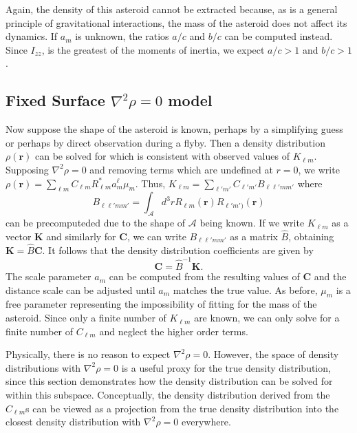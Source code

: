 \documentclass{aastex631}
\begin{document}
Again, the density of this asteroid cannot be extracted because, as is a general principle of gravitational interactions, the mass of the asteroid does not affect its dynamics. If $a_m$ is unknown, the ratios $a/c$ and $b/c$ can be computed instead. Since $I_{zz}$, is the greatest of the moments of inertia, we expect $a/c > 1$ and $b/c > 1$. 


\subsection{Fixed Surface $\nabla^2 \rho = 0$ model}
\label{sec:laplace-rho}
Now suppose the shape of the asteroid is known, perhaps by a simplifying guess or perhaps by direct observation during a flyby. Then a density distribution $\rho(\bm r)$ can be solved for which is consistent with observed values of $K_{\ell m}$. Supposing $\nabla^2 \rho = 0$ and removing terms which are undefined at $r=0$, we write $\rho(\bm r) = \sum_{\ell m} C_{\ell m} R_{\ell m}^* a_m^\ell \mu_m$. Thus, $K_{\ell m} = \sum_{\ell' m'} C_{\ell' m'} B_{\ell \ell' m m'}$ where
\begin{equation}
  B_{\ell \ell' m m'} = \int_{\mathcal{A}}d^3 r R_{\ell m}(\bm r) R_{\ell' m')}(\bm r)
  \label{eqn:blm}
\end{equation}
can be precomputeded due to the shape of $\mathcal{A}$ being known.
If we write $K_{\ell m}$ as a vector $\bm K$ and similarly for $\bm C$, we can write $B_{\ell \ell' m m'}$ as a matrix $\hat B$, obtaining $\bm K = \hat B \bm C$. It follows that the density distribution coefficients are given by
\begin{equation}
\bm C = \hat B^{-1} \bm K.
\end{equation}
The scale parameter $a_m$ can be computed from the resulting values of $\bm C$ and the distance scale can be adjusted until $a_m$ matches the true value. As before, $\mu_m$ is a free parameter representing the impossibility of fitting for the mass of the asteroid. Since only a finite number of $K_{\ell m}$ are known, we can only solve for a finite number of $C_{\ell m}$ and neglect the higher order terms.

Physically, there is no reason to expect $\nabla^2 \rho = 0$. However, the space of density distributions with $\nabla^2 \rho = 0$ is a useful proxy for the true density distribution, since this section demonstrates how the density distribution can be solved for within this subspace. Conceptually, the density distribution derived from the $C_{\ell m}$s can be viewed as a projection from the true density distribution into the closest density distribution with $\nabla^2 \rho = 0$ everywhere.
\end{document}
